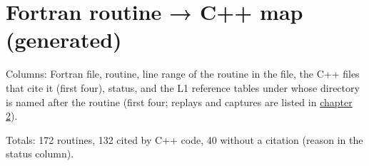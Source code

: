 \chapter{\texorpdfstring{Fortran routine → C++ map (generated)}{Fortran routine → C++ map (generated)}}\label{translation_report-fortranu5froutineu5fmap}
Columns: Fortran file, routine, line range of the routine in the file, the C++ files that cite it (first four), status, and the L1 reference tables under  whose directory is named after the routine (first four; replays and captures are listed in \hyperref[translation_report-02u5fvalidation]{chapter 2}).

Totals: 172 routines, 132 cited by C++ code, 40 without a citation (reason in the status column).

